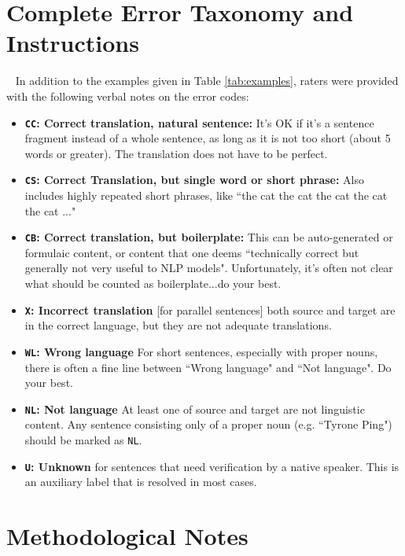 \section{Complete Error Taxonomy and Instructions}~\label{app:taxonomy}
In addition to the examples given in Table \ref{tab:examples}, raters were provided with the following verbal notes on the error codes:
\begin{itemize}
    \item \textbf{\texttt{CC}: Correct translation, natural sentence:} It's OK if it's a sentence fragment instead of a whole sentence, as long as it is not too short (about 5 words or greater). The translation does not have to be perfect.
    \item \textbf{\texttt{\texttt{CS}}: Correct Translation, but single word or short phrase:} Also includes highly repeated short phrases, like ``the cat the cat the cat the cat the cat ..."
    \item \textbf{\texttt{CB}: Correct translation, but boilerplate: } This can be auto-generated or formulaic content, or content that one deems ``technically correct but generally not very useful to NLP models". Unfortunately, it's often not clear what should be counted as boilerplate...do your best.
    \item \textbf{\texttt{X}: Incorrect translation} [for parallel sentences] both source and target are in the correct language, but they are not adequate translations.
    \item \textbf{\texttt{WL}: Wrong language} For short sentences, especially with proper nouns, there is often a fine line between ``Wrong language" and ``Not language". Do your best.
    \item \textbf{\texttt{NL}: Not language} At least one of source and target are not linguistic content. Any sentence consisting only of a proper noun (e.g. ``Tyrone Ping") should be marked as \texttt{NL}.
    \item \textbf{\texttt{U}: Unknown} for sentences that need verification by a native speaker. This is an auxiliary label that is resolved in most cases.
\end{itemize}







\section{Methodological Notes}\label{app:strategies}

